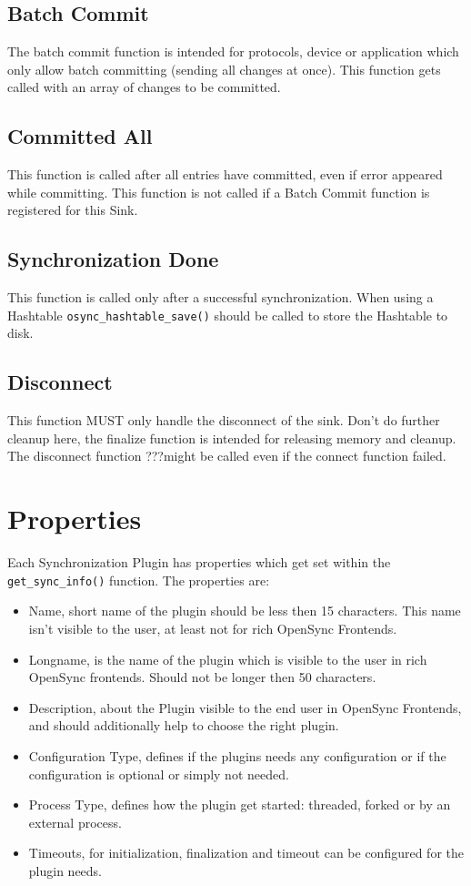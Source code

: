 \subsection{Batch Commit}
The batch commit function is intended for protocols, device or application which
only allow batch committing (sending all changes at once). This function gets
called with an array of changes to be committed.
\subsection{Committed All}
This function is called after all entries have committed, even if error appeared
while committing. This function is not called if a Batch Commit function is
registered for this Sink.
\subsection{Synchronization Done}
This function is called only after a successful synchronization.  When using a
Hashtable \verb|osync_hashtable_save()| should be called to store the Hashtable
to disk.
\subsection{Disconnect}
This function MUST only handle the disconnect of the sink. Don't do further
cleanup here, the finalize function is intended for releasing memory and
cleanup. The disconnect function ???might be called even if the connect
function failed.
\section{Properties}
Each Synchronization Plugin has properties which get set within the
\verb|get_sync_info()| function. The properties are:

\begin{itemize}
\item Name, short name of the plugin should be less then 15 characters. This
name isn't visible to the user, at least not for rich OpenSync Frontends.
\item Longname, is the name of the plugin which is visible to the user in
rich OpenSync frontends. Should not be longer then 50 characters.
\item Description, about the Plugin visible to the end user in OpenSync
Frontends, and should additionally help to choose the right plugin.
\item Configuration Type, defines if the plugins needs any configuration or if
the configuration is optional or simply not needed.
\item Process Type, defines how the plugin get started: threaded, forked or by 
an external process.
\item Timeouts, for initialization, finalization and timeout can be configured
for the plugin needs. 
\end{itemize}

